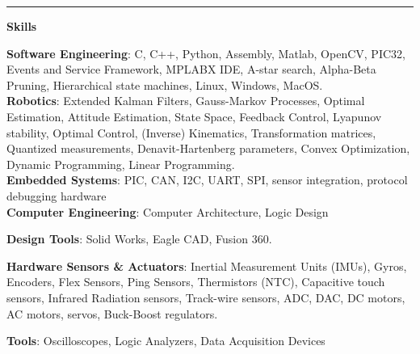 \documentclass[paper=a4,fontsize=11pt]{article} %
\def \sectionSpace      {0.3cm}     %
\def \leftColSpace      {0.125}     %
\def \bigMiddleColSpace {0}         %
\def \lineWidth         {18cm}      %
\def \lineThickness     {2pt}       %
\begin{document}
\vspace{\sectionSpace}
\noindent\rule{\lineWidth}{\lineThickness}
\noindent
\begin{minipage}[t]{\leftColSpace\linewidth}
\begin{flushleft}
\noindent \textbf{Skills}\\
\end{flushleft}
\end{minipage}
\begin{minipage}[t]{\bigMiddleColSpace\linewidth}
\begin{flushleft}
\noindent \textbf{Software Engineering}: C, C++, Python, Assembly, Matlab, OpenCV, PIC32, Events and Service Framework, MPLABX IDE, A-star search, Alpha-Beta Pruning, Hierarchical state machines, Linux, Windows, MacOS.\\

\vspace{\sectionSpace}
\noindent \textbf{Robotics}: Extended Kalman Filters, Gauss-Markov Processes, Optimal Estimation, Attitude Estimation, State Space, Feedback Control, Lyapunov stability, Optimal Control, (Inverse) Kinematics, Transformation matrices, Quantized measurements, Denavit-Hartenberg parameters, Convex Optimization, Dynamic Programming, Linear Programming.\\

\vspace{\sectionSpace}
\noindent \textbf{Embedded Systems}: PIC, CAN, I2C, UART, SPI, sensor integration, protocol debugging hardware\\

\vspace{\sectionSpace}
\noindent \textbf{Computer Engineering}: Computer Architecture, Logic Design

\vspace{\sectionSpace}
\noindent \textbf{Design Tools}: Solid Works, Eagle CAD, Fusion 360.

\vspace{\sectionSpace}
\noindent \textbf{Hardware Sensors \& Actuators}: Inertial Measurement Units (IMUs), Gyros, Encoders, Flex Sensors, Ping Sensors, Thermistors (NTC), Capacitive touch sensors, Infrared Radiation sensors, Track-wire sensors, ADC, DAC, DC motors, AC motors, servos, Buck-Boost regulators.

\vspace{\sectionSpace}
\noindent \textbf{Tools}: Oscilloscopes, Logic Analyzers, Data Acquisition Devices
\end{flushleft}
\end{minipage}
\end{document}
